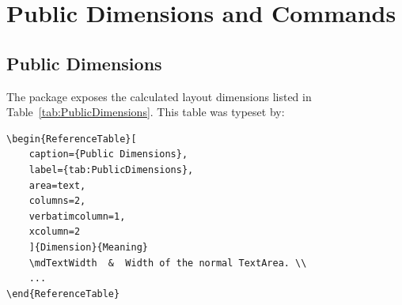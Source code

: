 \documentclass[
11pt,
a4paper,
oneside
]{scrbook}
\begin{document}
\chapter{Public Dimensions and Commands}
\label{chap:public-api}

\section{Public Dimensions}

The package exposes the calculated layout dimensions listed in Table~\ref{tab:PublicDimensions}.
%	
%	
%	
%	
%	
%	
%	
%	
%	
%	
%	
%	
%	
%	
%	
%	
This table was typeset by:
\begin{Verbatim}
\begin{ReferenceTable}[
	caption={Public Dimensions},
	label={tab:PublicDimensions},
	area=text,
	columns=2,
	verbatimcolumn=1,
	xcolumn=2
	]{Dimension}{Meaning}
	\mdTextWidth  &  Width of the normal TextArea. \\
	...
\end{ReferenceTable}
\end{Verbatim}
\end{document}
